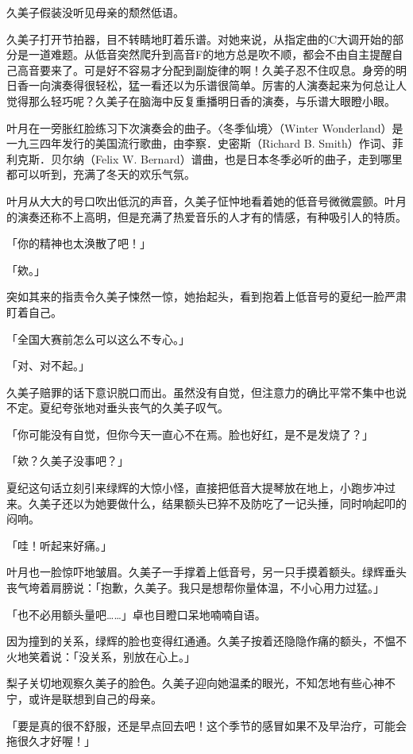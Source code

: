 \documentclass[UTF8]{ctexart}
\begin{document}
    久美子假装没听见母亲的颓然低语。 

    久美子打开节拍器，目不转睛地盯着乐谱。对她来说，从指定曲的C大调开始的部分是一道难题。从低音突然爬升到高音F的地方总是吹不顺，都会不由自主提醒自己高音要来了。可是好不容易才分配到副旋律的啊！久美子忍不住叹息。身旁的明日香一向演奏得很轻松，猛一看还以为乐谱很简单。厉害的人演奏起来为何总让人觉得那么轻巧呢？久美子在脑海中反复重播明日香的演奏，与乐谱大眼瞪小眼。 

    叶月在一旁胀红脸练习下次演奏会的曲子。〈冬季仙境〉（Winter Wonderland）是一九三四年发行的美国流行歌曲，由李察．史密斯（Richard B. Smith）作词、菲利克斯．贝尔纳（Felix W. Bernard）谱曲，也是日本冬季必听的曲子，走到哪里都可以听到，充满了冬天的欢乐气氛。 

    叶月从大大的号口吹出低沉的声音，久美子怔忡地看着她的低音号微微震颤。叶月的演奏还称不上高明，但是充满了热爱音乐的人才有的情感，有种吸引人的特质。 

    「你的精神也太涣散了吧！」 

    「欸。」 

    突如其来的指责令久美子悚然一惊，她抬起头，看到抱着上低音号的夏纪一脸严肃盯着自己。 

    「全国大赛前怎么可以这么不专心。」 

    「对、对不起。」 

    久美子赔罪的话下意识脱口而出。虽然没有自觉，但注意力的确比平常不集中也说不定。夏纪夸张地对垂头丧气的久美子叹气。 

    「你可能没有自觉，但你今天一直心不在焉。脸也好红，是不是发烧了？」 

    「欸？久美子没事吧？」 

    夏纪这句话立刻引来绿辉的大惊小怪，直接把低音大提琴放在地上，小跑步冲过来。久美子还以为她要做什么，结果额头已猝不及防吃了一记头捶，同时响起叩的闷响。 

    「哇！听起来好痛。」 

    叶月也一脸惊吓地皱眉。久美子一手撑着上低音号，另一只手摸着额头。绿辉垂头丧气垮着肩膀说：「抱歉，久美子。我只是想帮你量体温，不小心用力过猛。」 

    「也不必用额头量吧……」卓也目瞪口呆地喃喃自语。 

    因为撞到的关系，绿辉的脸也变得红通通。久美子按着还隐隐作痛的额头，不愠不火地笑着说：「没关系，别放在心上。」 

    梨子关切地观察久美子的脸色。久美子迎向她温柔的眼光，不知怎地有些心神不宁，或许是联想到自己的母亲。 

    「要是真的很不舒服，还是早点回去吧！这个季节的感冒如果不及早治疗，可能会拖很久才好喔！」 
\end{document}
